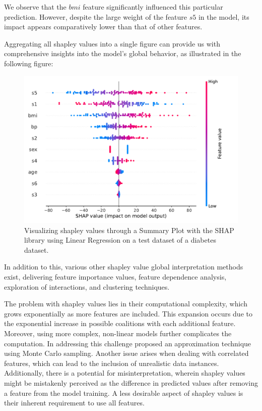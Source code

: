 We observe that the $bmi$ feature significantly influenced this particular prediction. However, despite the large weight of the feature $s5$ in the model, its impact appears comparatively lower than that of other features.

Aggregating all shapley values into a single figure can provide us with comprehensive insights into the model's global behavior, as illustrated in the following figure:

\begin{figure}[H]
    \centering
    \includegraphics[width=0.8\linewidth]{pics/shap_summary_plot.pdf}
    \caption{Visualizing shapley values through a Summary Plot with the SHAP library using Linear Regression on a test dataset of a diabetes dataset.}
    \label{fig:shapley_sum}
\end{figure}

In addition to this, various other shapley value global interpretation methods exist, delivering feature importance values, feature dependence analysis, exploration of interactions, and clustering techniques.

The problem with shapley values lies in their computational complexity, which grows exponentially as more features are included. This expansion occurs due to the exponential increase in possible coalitions with each additional feature. Moreover, using more complex, non-linear models further complicates the computation. In addressing this challenge \cite{vstrumbelj2014explaining} proposed an approximation technique using Monte Carlo sampling.
Another issue arises when dealing with correlated features, which can lead to the inclusion of unrealistic data instances. Additionally, there is a potential for misinterpretation, wherein shapley values might be mistakenly perceived as the difference in predicted values after removing a feature from the model training. 
A less desirable aspect of shapley values is their inherent requirement to use all features.
